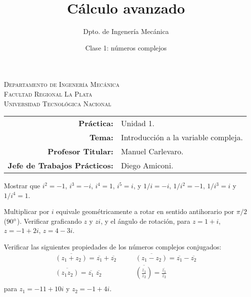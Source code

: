 \documentclass[11pt]{article}
\title{Cálculo avanzado}
\author{Dpto. de Ingenería Mecánica}
\date{Clase 1: números complejos}
\begin{document}

\begin{center}
\end{center} 

\begin{center}
\vspace{\baselineskip}
\Large{\textsc{Departamento de Ingenería Mecánica}} \\
\textsc{Facultad Regional La Plata} \\
\textsc{Universidad Tecnológica Nacional}
\end{center}


\begin{center}
\begin{tabular}{r l}
    \textbf{Práctica:} & Unidad 1. \\
 \textbf{Tema:} & Introducción a la variable compleja. \\
 \textbf{Profesor Titular:} & Manuel Carlevaro. \\
 \textbf{Jefe de Trabajos Prácticos:} & Diego Amiconi. \\
\end{tabular}\end{center}

\vspace{1em}

\begin{question} %
 Mostrar que $i^2 = -1$, $i^3 = -i$, $i^4 = 1$, $i^5 = i$, y $1/i = -i$, $1/i^2 = -1$, $1/i^3 = i$ y $1/i^4 = 1$.
\end{question}

\begin{question} %
 Multiplicar por $i$ equivale geométricamente a rotar en sentido antihorario por $\pi/2$ ($90\degree$). Verificar graficando $z$ y $zi$, y el ángulo de rotación, para $z = 1 + i$, $z = -1 + 2 i$, $z = 4 - 3 i$.
\end{question}

\begin{question} %
 Verificar las siguientes propiedades de los números complejos conjugados:
 \begin{align*}
  \overline{(z_1 + z_2)} = \overline{z_1} + \overline{z_2} &\qquad \overline{(z_1 - z_2)} = \overline{z_1} - \overline{z_2} \\
  \overline{(z_1 z_2)} = \overline{z_1} \; \overline{z_2} &\qquad \overline{ \left( \frac{z_1}{z_2} \right) } = \frac{\overline{z_1}}{\overline{z_2}} \\
 \end{align*}
 para $z_1 = -11 + 10 i$ y $z_2 = -1 + 4 i$.
\end{question}
\end{document}
